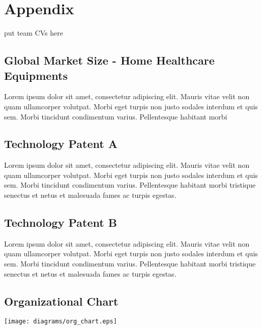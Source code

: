 \documentclass[11pt]{article}
\begin{document}
\section{Appendix}
put team CVs here\newline
\subsection{Global Market Size - Home Healthcare Equipments}
\begin{center}
Lorem ipsum dolor sit amet, consectetur adipiscing elit. Mauris vitae velit 
non quam ullamcorper volutpat. Morbi eget turpis non justo sodales interdum 
et quis sem. Morbi tincidunt condimentum varius. Pellentesque habitant morbi 
\newline
\end{center}
\hypertarget{ref_org_chart}{}
\subsection{Technology Patent A}
Lorem ipsum dolor sit amet, consectetur adipiscing elit. Mauris vitae velit 
non quam ullamcorper volutpat. Morbi eget turpis non justo sodales interdum 
et quis sem. Morbi tincidunt condimentum varius. Pellentesque habitant morbi 
tristique senectus et netus et malesuada fames ac turpis egestas.\newline
\subsection{Technology Patent B} 
Lorem ipsum dolor sit amet, consectetur adipiscing elit. Mauris vitae velit 
non quam ullamcorper volutpat. Morbi eget turpis non justo sodales interdum 
et quis sem. Morbi tincidunt condimentum varius. Pellentesque habitant morbi 
tristique senectus et netus et malesuada fames ac turpis egestas.\newline

\subsection{Organizational Chart}
\begin{center}
\texttt{[image: diagrams/org\_chart.eps]}
\end{center}
\end{document}
